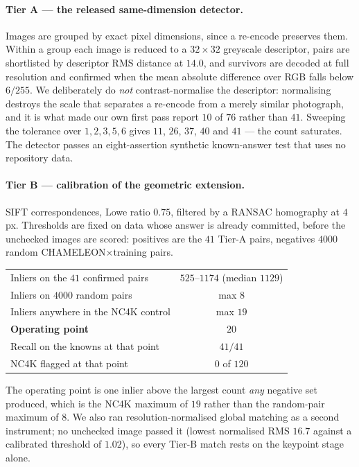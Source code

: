 \documentclass{article} %
\begin{document}
\paragraph{Tier A --- the released same-dimension detector.} Images are grouped by exact pixel
dimensions, since a re-encode preserves them. Within a group each image is reduced to a
$32\times32$ greyscale descriptor, pairs are shortlisted by descriptor RMS distance at $14.0$, and
survivors are decoded at full resolution and confirmed when the mean absolute difference over RGB
falls below $6/255$. We deliberately do \emph{not} contrast-normalise the descriptor: normalising
destroys the scale that separates a re-encode from a merely similar photograph, and it is what made
our own first pass report $10$ of $76$ rather than $41$. Sweeping the tolerance over
$1, 2, 3, 5, 6$ gives $11$, $26$, $37$, $40$ and $41$ --- the count saturates. The detector passes an
eight-assertion synthetic known-answer test that uses no repository data.

\paragraph{Tier B --- calibration of the geometric extension.} SIFT correspondences, Lowe ratio
$0.75$, filtered by a RANSAC homography at $4$ px. Thresholds are fixed on data whose answer is
already committed, before the unchecked images are scored: positives are the $41$ Tier-A pairs,
negatives $4000$ random CHAMELEON$\times$training pairs.

\begin{center}\small
\begin{tabular}{lc}
\toprule
Inliers on the $41$ confirmed pairs & $525$--$1174$ (median $1129$) \\
Inliers on $4000$ random pairs & max $8$ \\
Inliers anywhere in the NC4K control & max $19$ \\
\textbf{Operating point} & \textbf{$20$} \\
Recall on the knowns at that point & $41/41$ \\
NC4K flagged at that point & $0$ of $120$ \\
\bottomrule
\end{tabular}
\end{center}

The operating point is one inlier above the largest count \emph{any} negative set produced, which is
the NC4K maximum of $19$ rather than the random-pair maximum of $8$. We also ran resolution-normalised
global matching as a second instrument; no unchecked image passed it (lowest normalised RMS $16.7$
against a calibrated threshold of $1.02$), so every Tier-B match rests on the keypoint stage alone.
\end{document}
